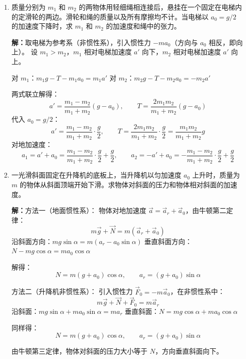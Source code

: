 \documentclass{ctexart}
\begin{document}
\begin{enumerate}
$x$ 方向：$N\sin\theta = \Delta m\,x\omega^{2}$（向心力）
$y$ 方向：$N\cos\theta = \Delta m\,g$

两式相除：
\[
\tan\theta = \frac{x\omega^{2}}{g}
\]
由导数的几何意义 $\tan\theta = \dfrac{\mathrm{d}y}{\mathrm{d}x}$，得
\[
\mathrm{d}y = \frac{\omega^{2}}{g}x\,\mathrm{d}x
\]
积分：
\[
\int_{0}^{y} \mathrm{d}y = \frac{\omega^{2}}{g}\int_{0}^{x} x\,\mathrm{d}x
\]
\[
y = \frac{\omega^{2}}{2g}x^{2}
\]
为抛物线方程。由旋转对称性，液面为旋转抛物面，证毕。

\item 质量分别为 $m_1$ 和 $m_2$ 的两物体用轻细绳相连接后，悬挂在一个固定在电梯内的定滑轮的两边。滑轮和绳的质量以及所有摩擦均不计。当电梯以 $a_0 = g/2$ 的加速度下降时，求 $m_1$ 和 $m_2$ 的加速度和绳中的张力。

\textbf{解：}取电梯为参考系（非惯性系），引入惯性力 $-ma_0$（方向与 $a_0$ 相反，即向上）。
设 $m_1 > m_2$，$m_1$ 相对电梯加速度 $a'$ 向下，$m_2$ 相对电梯加速度 $a'$ 向上。

对 $m_1$：$m_1g - T - m_1a_0 = m_1a'$
对 $m_2$：$m_2g - T - m_2a_0 = -m_2a'$

两式联立解得：
\[
a' = \frac{m_1 - m_2}{m_1 + m_2}(g - a_0),\qquad
T = \frac{2m_1 m_2}{m_1 + m_2}(g - a_0)
\]
代入 $a_0 = g/2$：
\[
a' = \frac{m_1 - m_2}{m_1 + m_2}\cdot\frac{g}{2},\qquad
T = \frac{2m_1 m_2}{m_1 + m_2}\cdot\frac{g}{2} = \frac{m_1 m_2}{m_1 + m_2}g
\]
对地加速度：
\[
a_1 = a' + a_0 = \frac{m_1 - m_2}{m_1 + m_2}\cdot\frac{g}{2} + \frac{g}{2},\qquad
a_2 = -a' + a_0 = -\frac{m_1 - m_2}{m_1 + m_2}\cdot\frac{g}{2} + \frac{g}{2}
\]

\item 一光滑斜面固定在升降机的底板上，当升降机以匀加速度 $a_0$ 上升时，质量为 $m$ 的物体从斜面顶端开始下滑。求物体对斜面的压力和物体相对斜面的加速度。

\textbf{解：}方法一（地面惯性系）：
物体对地加速度 $\vec{a} = \vec{a}_r + \vec{a}_0$，由牛顿第二定律：
\[
m\vec{g} + \vec{N} = m(\vec{a}_r + \vec{a}_0)
\]
沿斜面方向：$mg\sin\alpha = m(a_r - a_0\sin\alpha)$
垂直斜面方向：$N - mg\cos\alpha = ma_0\cos\alpha$

解得：
\[
N = m(g + a_0)\cos\alpha,\qquad a_r = (g + a_0)\sin\alpha
\]

方法二（升降机非惯性系）：
引入惯性力 $\vec{F}_0 = -m\vec{a}_0$，在非惯性系中：
\[
m\vec{g} + \vec{N} + \vec{F}_0 = m\vec{a}_r
\]
沿斜面：$mg\sin\alpha + ma_0\sin\alpha = ma_r$
垂直斜面：$N = mg\cos\alpha + ma_0\cos\alpha$

同样得：
\[
N = m(g + a_0)\cos\alpha,\qquad a_r = (g + a_0)\sin\alpha
\]

由牛顿第三定律，物体对斜面的压力大小等于 $N$，方向垂直斜面向下。

\end{enumerate}
\end{document}

